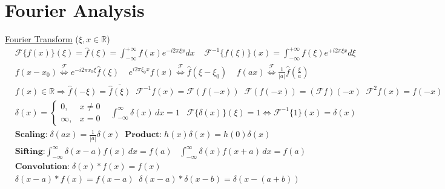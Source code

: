 \section*{\normalsize Fourier Analysis}
\underline{Fourier Transform}{\normalfont\scriptsize \; ($\xi, x\in \mathbb{R}$)}
\begin{align*}
&\mathcal{F}\{f(x)\}(\xi) \!=\!\hat f(\xi) \!= \!\int_{-\infty}^{+\infty}\!f(x)e^{-i 2\pi \xi x}  dx \; \;\; \; \mathcal{F}^{-1}\{f(\xi)\}(x) = \int_{-\infty}^{+\infty}\! f(\xi)e^{+i2\pi\xi x}d\xi \\
&f(x-x_0)\stackrel{\mathcal{F}}{\Longleftrightarrow} e^{-i2\pi x_0\xi} \hat f(\xi)\; \; \;\;  e^{i2\pi\xi_0 x}f(x) \stackrel{\mathcal{F}}{\Longleftrightarrow} \hat{f}(\xi-\xi_0)\; \; \; \; f(ax) \stackrel{\mathcal{F}}{\Longleftrightarrow}\frac{1}{|a|}\hat{f}\left( \frac{\xi}{a}\right)\\
&f(x)\!\in\! \mathbb{R}\!\Rightarrow \!\hat{f}(-\xi)\!=\! \overline{\hat{f}(\xi)} \; \; \mathcal{F}^{-\!1}\!f(x) \!=\! \mathcal{F}(f(-x)\!) \;\; \mathcal{F}(f(-x)\!)\!=\!(\mathcal{F}f)(-x)\; \; \mathcal{F}^2\!f(x)\!=\!f(-x)
\end{align*}
\underline{}
\begin{align*}
&\delta(x) = \begin{cases}
0, & x \ne 0 \\
\infty, & x = 0
\end{cases}\;\;\;
\int_{-\infty}^{\infty} \delta(x) \, dx = 1 \; \; \; \mathcal{F}\{\delta(x)\}(\xi) = 1\Leftrightarrow \mathcal{F}^{-1}\{1\}(x)=\delta(x)\\
&\textbf{Scaling:} \; \delta(ax) = \frac{1}{|a|} \delta(x) \; \;\textbf{Product:}   \; 
h(x) \delta(x) = h(0) \delta(x)\\
&\textbf{Sifting:}
\int_{-\infty}^{\infty} \delta(x - a) f(x) \, dx = f(a)\; \; \;  \int_{-\infty}^{\infty} \delta(x) f(x + a) \, dx = f(a)\\
&\textbf{Convolution:}\; 
\delta(x) * f(x) = f(x)\\
&\delta(x - a) * f(x) = f(x - a)\; \; \delta(x - a) * \delta(x - b) = \delta(x - (a + b))\\
\end{align*}
